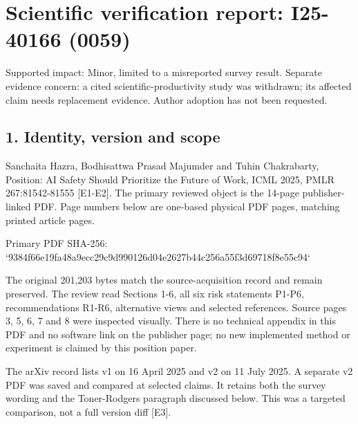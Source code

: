 \documentclass[10pt]{article}
\begin{document}
\section*{Scientific verification report: I25-40166 (0059)}
Supported impact: Minor, limited to a misreported survey result. Separate evidence concern: a cited scientific-productivity study was withdrawn; its affected claim needs replacement evidence. Author adoption has not been requested.\par
\subsection*{1. Identity, version and scope}
Sanchaita Hazra, Bodhisattwa Prasad Majumder and Tuhin Chakrabarty, Position: AI Safety Should Prioritize the Future of Work, ICML 2025, PMLR 267:81542-81555 [E1-E2]. The primary reviewed object is the 14-page publisher-linked PDF. Page numbers below are one-based physical PDF pages, matching printed article pages.\par
Primary PDF SHA-256:
`9384f66e19fa48a9ecc29c9d990126d04e2627b44c256a55f3d69718f8e55c94`\par
The original 201,203 bytes match the source-acquisition record and remain preserved. The review read Sections 1-6, all six risk statements P1-P6, recommendations R1-R6, alternative views and selected references. Source pages 3, 5, 6, 7 and 8 were inspected visually. There is no technical appendix in this PDF and no software link on the publisher page; no new implemented method or experiment is claimed by this position paper.\par
The arXiv record lists v1 on 16 April 2025 and v2 on 11 July 2025. A separate v2 PDF was saved and compared at selected claims. It retains both the survey wording and the Toner-Rodgers paragraph discussed below. This was a targeted comparison, not a full version diff [E3].\par
\end{document}
